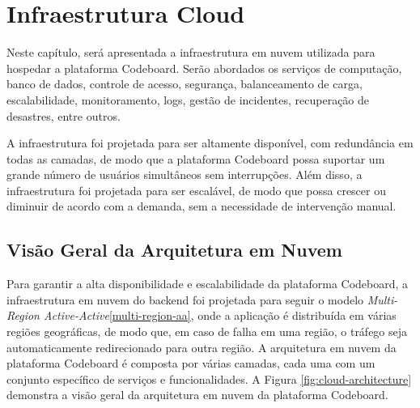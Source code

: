 


\section{Infraestrutura Cloud}

Neste capítulo, será apresentada a infraestrutura em nuvem utilizada para hospedar a plataforma Codeboard. Serão abordados os serviços de computação, banco de dados, controle de acesso, segurança, balanceamento de carga, escalabilidade, monitoramento, logs, gestão de incidentes, recuperação de desastres, entre outros. 

A infraestrutura foi projetada para ser altamente disponível, com redundância em todas as camadas, de modo que a plataforma Codeboard possa suportar um grande número de usuários simultâneos sem interrupções. Além disso, a infraestrutura foi projetada para ser escalável, de modo que possa crescer ou diminuir de acordo com a demanda, sem a necessidade de intervenção manual.

\subsection{Visão Geral da Arquitetura em Nuvem}

Para garantir a alta disponibilidade e escalabilidade da plataforma Codeboard, a infraestrutura em nuvem do backend foi projetada para seguir o modelo \emph{Multi-Region Active-Active}\ref{multi-region-aa}, onde a aplicação é distribuída em várias regiões geográficas, de modo que, em caso de falha em uma região, o tráfego seja automaticamente redirecionado para outra região. A arquitetura em nuvem da plataforma Codeboard é composta por várias camadas, cada uma com um conjunto específico de serviços e funcionalidades. A Figura \ref{fig:cloud-architecture} demonstra a visão geral da arquitetura em nuvem da plataforma Codeboard. 

